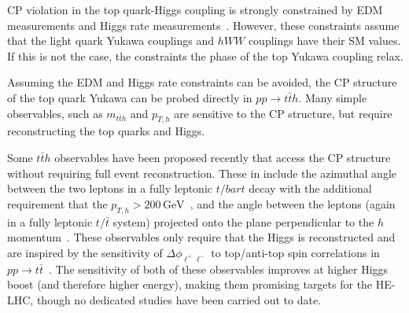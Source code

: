 
CP violation in the top quark-Higgs coupling is strongly constrained by EDM measurements and Higgs rate measurements~\cite{Brod:2013cka}. However, these constraints assume that the light quark Yukawa couplings and $hWW$ couplings have their SM values. If this is not the case, the constraints the phase of the top Yukawa coupling relax.
    
Assuming the EDM and Higgs rate  constraints can be avoided, the CP structure of the top quark Yukawa can be probed directly in $pp \to t\bar t h$. Many simple observables, such as $m_{t\bar t h}$ and $p_{T,h}$ are sensitive to the CP structure, but require reconstructing the top quarks and Higgs.

Some $t\bar t h$ observables have been proposed recently that access the CP structure without requiring full event reconstruction. These in include the azimuthal angle between the two leptons in a fully leptonic $t/bar{t}$ decay with the additional requirement that the $p_{T,h} > 200\, \text{GeV}$~\cite{Buckley:2015vsa}, and the angle between the leptons (again in a fully leptonic $t/\bar t$ system) projected onto the plane perpendicular to the $h$ momentum~\cite{Boudjema:2015nda}. These observables only require that the Higgs is reconstructed and are inspired by the sensitivity of $\Delta \phi_{\ell^+\ell^-}$ to top/anti-top spin correlations in $pp \to t\bar t$~\cite{Mahlon:1995zn}. The sensitivity of both of these observables improves at higher Higgs boost (and therefore higher energy), making them promising targets for the HE-LHC, though no dedicated studies have been carried out to date.

